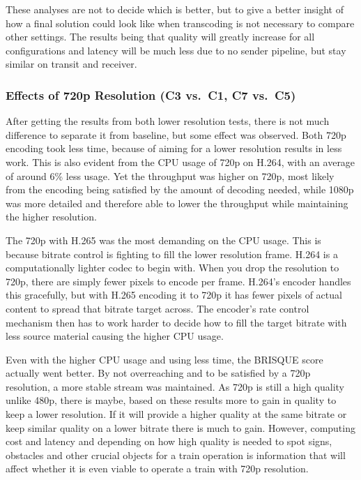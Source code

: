 These analyses are not to decide which is better, but to give a better insight of how a final solution could look like when transcoding is not necessary to compare other settings. The results being that quality will greatly increase for all configurations and latency will be much less due to no sender pipeline, but stay similar on transit and receiver.

\subsubsection{Effects of 720p Resolution (C3 vs.\ C1, C7 vs.\ C5)}\label{subsubsec:resolutionDiscussion}

After getting the results from both lower resolution tests, there is not much difference to separate it from baseline, but some effect was observed. Both 720p encoding took less time, because of aiming for a lower resolution results in less work. This is also evident from the CPU usage of 720p on H.264, with an average of around 6\% less usage. Yet the throughput was higher on 720p, most likely from the encoding being satisfied by the amount of decoding needed, while 1080p was more detailed and therefore able to lower the throughput while maintaining the higher resolution.

The 720p with H.265 was the most demanding on the CPU usage. This is because bitrate control is fighting to fill the lower resolution frame. H.264 is a computationally lighter codec to begin with. When you drop the resolution to 720p, there are simply fewer pixels to encode per frame. H.264's encoder handles this gracefully, but with H.265 encoding it to 720p it has fewer pixels of actual content to spread that bitrate target across. The encoder's rate control mechanism then has to work harder to decide how to fill the target bitrate with less source material causing the higher CPU usage.

Even with the higher CPU usage and using less time, the BRISQUE score actually went better. By not overreaching and to be satisfied by a 720p resolution, a more stable stream was maintained. As 720p is still a high quality unlike 480p, there is maybe, based on these results more to gain in quality to keep a lower resolution. If it will provide a higher quality at the same bitrate or keep similar quality on a lower bitrate there is much to gain. However, computing cost and latency and depending on how high quality is needed to spot signs, obstacles and other crucial objects for a train operation is information that will affect whether it is even viable to operate a train with 720p resolution.

